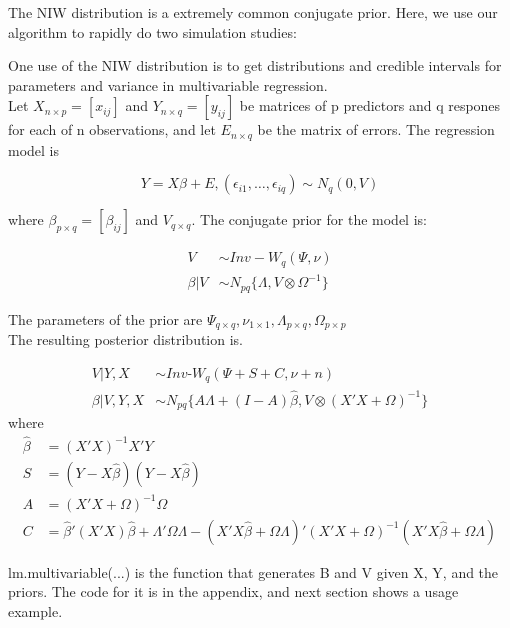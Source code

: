 \documentclass[english]{report}
\begin{document}

The NIW distribution is a extremely common conjugate prior. Here, we use our algorithm to rapidly do two simulation studies:



One use of the NIW distribution is to get distributions and credible intervals for parameters and variance in multivariable regression.\\

Let $X_{n\times p} = [x_{ij}]$ and $Y_{n\times q} = [y_{ij}]$ be matrices of p predictors and q respones for each of n observations, and let $E_{n\times q}$ be the matrix of errors. The regression model is

\[Y = X\beta + E, (\epsilon_{i1},\hdots,\epsilon_{i q})\sim N_q(0,V)\]

where $\beta_{p\times q} = [\beta_{ij}] $ and $V_{q\times q}$. The conjugate prior for the model is:

\begin{align*}
	V &\sim  Inv-W_q(\Psi,\nu)\\
	\beta|V &\sim N_{pq}\{\Lambda, V  \otimes \Omega^{-1}\}
\end{align*}

The parameters of the prior are $\Psi_{q\times q}, \nu_{1\times 1}, \Lambda_{p\times q}, \Omega_{p\times p}$\\

The resulting posterior distribution is.


\begin{align*}
	V|Y,X &\sim  Inv\text{-}W_q(\Psi+S+C,\nu+n)\\
	\beta|V,Y,X &\sim N_{pq}\{A\Lambda + (I-A)\hat{\beta}, V  \otimes (X'X +\Omega)^{-1}\}
\end{align*}
where 
\begin{align*}
\hat{\beta} &= (X'X)^{-1}X'Y\\
S &= (Y-X\hat{\beta})(Y-X\hat{\beta})\\ 
A &= (X'X + \Omega)^{-1}\Omega\\
C &= \hat{\beta}'(X'X)\hat{\beta} + \Lambda'\Omega\Lambda - (X'X\hat{\beta} + \Omega\Lambda)'(X'X+\Omega)^{-1}(X'X\hat{\beta} + \Omega\Lambda)
\end{align*}


lm.multivariable(...) is the function that generates B and V given X, Y, and the priors. The code for it is in the appendix, and next section shows a usage example.
\end{document}

